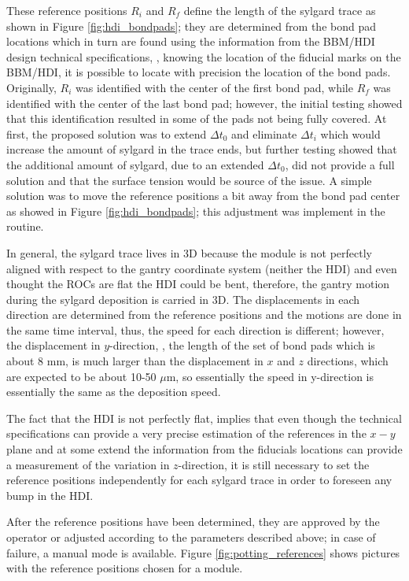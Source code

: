 These reference positions $R_i$ and $R_f$ define the length of the sylgard trace  as shown in Figure \ref{fig:hdi_bondpads}; they are determined from the bond pad locations which in turn are found using the information from the BBM/HDI design technical specifications, \ie, knowing the location of the fiducial marks on the BBM/HDI, it is possible to locate with precision the location of the bond pads. Originally, $R_i$ was identified with the center of the first bond pad, while $R_f$ was identified with the center of the last bond pad; however, the initial testing showed that this identification resulted in some of the pads not being fully covered. At first, the proposed solution was to extend $\Delta t_0$ and eliminate $\Delta t_i$ which would increase the amount of sylgard in the trace ends, but further testing showed that the additional amount of sylgard, due to an extended $\Delta t_0$, did not provide a full solution and that the surface tension would be source of the issue. A simple solution was to move the reference positions a bit away from the bond pad center as showed in Figure \ref{fig:hdi_bondpads}; this adjustment was implement in the routine. 

In general, the sylgard trace lives in 3D because the module is not perfectly aligned with respect to the gantry coordinate system (neither the HDI) and even thought the ROCs are flat the HDI could be bent, therefore, the gantry motion during the sylgard deposition is carried in 3D. The displacements in each direction are determined from the reference positions and the motions are done in the same time interval, thus, the speed for each direction is different; however, the displacement in $y$-direction, \ie, the length of the set of bond pads which is about 8 mm, is much larger than the displacement in $x$ and $z$ directions, which are expected to be about 10-50 $\mu$m, so essentially the speed in y-direction is essentially the same as the deposition speed.

The fact that the HDI is not perfectly flat, implies that even though the technical specifications can provide a very precise estimation of the references in the $x-y$ plane and at some extend the information from the fiducials locations can provide a measurement of the variation in $z$-direction, it is still necessary to set the reference positions independently for each sylgard trace in order to foreseen any bump in the HDI.

After the reference positions have been determined, they are approved by the operator or adjusted according to the parameters described above; in case of failure, a manual mode is available. Figure \ref{fig:potting_references} shows pictures with the reference positions chosen for a module.        

